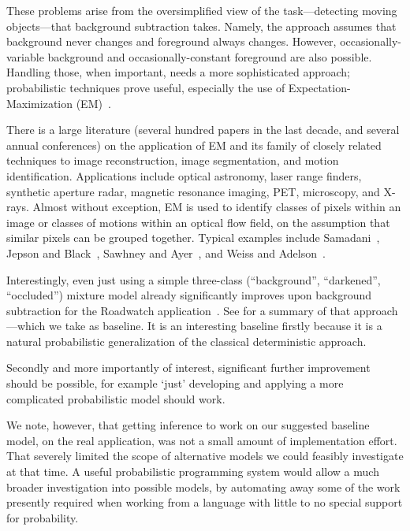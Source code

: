 These problems arise from the oversimplified view of the
task---detecting moving objects---that
background subtraction takes.  Namely, the approach assumes that
background never changes and foreground always changes.  However,
occasionally-variable background and occasionally-constant
foreground are also possible.  Handling those, when important, needs a
more sophisticated approach; probabilistic techniques prove useful,
especially the use of Expectation-Maximization (EM)~\cite{Dempster+al:1977}.

There is a large literature (several hundred papers in the last
decade, and several annual conferences) on the application
of EM and its family of closely related techniques
to image reconstruction, image segmentation, and
motion identification.   Applications include optical astronomy, laser
range finders, synthetic aperture radar, magnetic resonance imaging, PET, microscopy, and
X-rays.  Almost without exception, EM is used to identify classes of
pixels within an image or classes of motions within an optical flow
field, on the assumption that similar pixels can be grouped
together. Typical examples include Samadani~\cite{Samadani:1995},
Jepson and Black~\cite{Jepson+Black:1993}, Sawhney and
Ayer~\cite{Sawhney+Ayer:1996}, and Weiss and
Adelson~\cite{Weiss+Adelson:1996}.

Interestingly, even just using a simple three-class (``background'', ``darkened'',
``occluded'') mixture model already significantly improves upon
background subtraction for the Roadwatch application~\cite{friedman97uai}.  See
 for a summary of
that approach---which we take as baseline.  It is an interesting
baseline firstly because it is a natural probabilistic generalization of the
classical deterministic approach.

Secondly and more importantly of interest, significant further
improvement should be possible, for example `just' developing and
applying a more complicated probabilistic model should work.

We note, however, that getting inference to work on our suggested baseline
model, on the real application, was not a small amount of
implementation effort.  That severely limited the scope of alternative models we could
feasibly investigate at that time.  A useful probabilistic programming
system would allow a much broader investigation into possible models,
by automating away some of the work presently required when working
from a language with little to no special support for probability.



